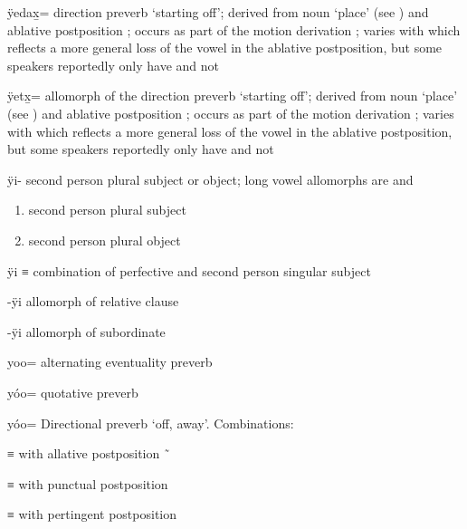 \begin{morphdesc}[resume*=alphalist]
\item[ÿedax̱=]\label{m:ÿedax̱=}
	direction preverb ‘starting off’;
	derived from noun  ‘place’ (see ) and ablative postposition ;
	occurs as part of the motion derivation
		;
	varies with  which reflects a more general loss of the vowel in the ablative
		postposition, but some speakers reportedly only have  and not 

\item[ÿetx̱=]\label{m:ÿetx̱=}
	allomorph of the direction preverb  ‘starting off’;
	derived from noun  ‘place’ (see ) and ablative postposition ;
	occurs as part of the motion derivation
		;
	varies with  which reflects a more general loss of the vowel in the ablative
		postposition, but some speakers reportedly only have  and not 

\item[ÿi-]\label{m:ÿi-}
	second person plural subject or object; long vowel allomorphs are  and 
	\begin{enumerate}
	\item	second person plural subject
	\item	second person plural object
	\end{enumerate}

\item[ÿi]
	≡ 
	combination of perfective  and
		second person singular subject 

\item[-ÿi]\label{m:-ÿi-rel}
	allomorph of relative clause 

\item[-ÿi]\label{m:-ÿi-sub}
	allomorph of subordinate 

\item[yoo=]
	alternating eventuality preverb

\item[yóo=]\label{m:yóo=quot}
	quotative preverb

\item[yóo=]\label{m:yóo=away}
	Directional preverb ‘off, away’.
	\newline
	Combinations:
	\begin{allolist}
	\item[\X{yóode}] ≡  with allative postposition  \~\ 
	\item[\X{yóot}]	 ≡  with punctual postposition 
	\item[\X{yóox̱}]	 ≡  with pertingent postposition 
	\end{allolist}


\end{morphdesc}
